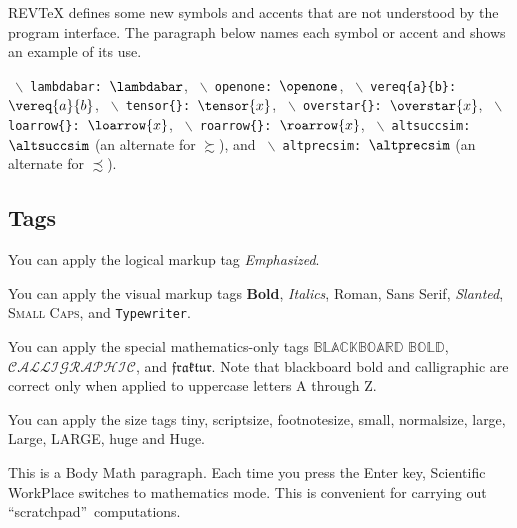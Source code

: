 \documentclass[aps,preprint]{revtex4}%
\begin{document}
REV\TeX{} defines some new symbols and accents that are not understood by the
program interface. The paragraph below names each symbol or accent and shows
an example of its use.

\texttt{%
$\backslash$%
lambdabar: }$\lambdabar$, \texttt{%
$\backslash$%
openone: }$\openone$, \texttt{%
$\backslash$%
vereq\{a\}\{b\}: }$\vereq{a}{b}$, \texttt{%
$\backslash$%
tensor\{\}: }$\tensor{x}$, \texttt{%
$\backslash$%
overstar\{\}: }$\overstar{x}$, \texttt{%
$\backslash$%
loarrow\{\}: }$\loarrow{x}$, \texttt{%
$\backslash$%
roarrow\{\}: }$\roarrow{x}$, \texttt{%
$\backslash$%
altsuccsim: }$\altsuccsim$ (an alternate for $\succsim$), and \texttt{%
$\backslash$%
altprecsim: }$\altprecsim$ (an alternate for $\precsim$).

\subsection{Tags}

You can apply the logical markup tag \emph{Emphasized}.

You can apply the visual markup tags \textbf{Bold}, \textit{Italics},
\textrm{Roman}, \textsf{Sans Serif}, \textsl{Slanted}, \textsc{Small Caps},
and \texttt{Typewriter}.

You can apply the special mathematics-only tags $\mathbb{BLACKBOARD}$
$\mathbb{BOLD}$, $\mathcal{CALLIGRAPHIC}$, and $\mathfrak{fraktur}$. Note that
blackboard bold and calligraphic are correct only when applied to uppercase
letters A through Z.

You can apply the size tags {\tiny tiny}, {\scriptsize scriptsize},
{\footnotesize footnotesize}, {\small small}, {\normalsize normalsize},
{\large large}, {\Large Large}, {\LARGE LARGE}, {\huge huge} and {\Huge Huge.}

This is a Body Math paragraph. Each time you press the Enter key, Scientific
WorkPlace switches to mathematics mode. This is convenient for carrying out
\textquotedblleft scratchpad\textquotedblright\ computations.
\end{document}
